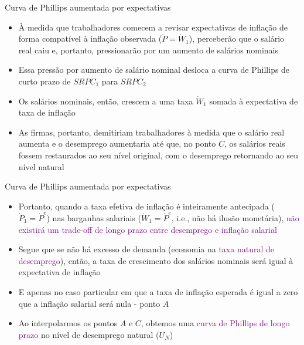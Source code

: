 \documentclass[10pt]{beamer}
\begin{document}
\begin{frame}{Curva de Phillips aumentada por expectativas}
    \begin{itemize}
        \item À medida que trabalhadores comecem a revisar expectativas de inflação de forma compatível à inflação observada ($\dot{P} = \dot{W}_1$), perceberão que o salário real caiu e, portanto, pressionarão por um aumento de salários nominais
        \bigskip
        \item Essa pressão por aumento de salário nominal desloca a curva de Phillips de curto prazo de $SRPC_1$ para $SRPC_2$
        \bigskip
        \item Os salários nominais, então, crescem a uma taxa $\dot{W}_1$ somada à expectativa de taxa de inflação
        \bigskip
        \item As firmas, portanto, demitiriam trabalhadores à medida que o salário real aumenta e o desemprego aumentaria até que, no ponto $C$, os salários reais fossem restaurados ao seu nível original, com o desemprego retornando ao seu nível natural
    \end{itemize}    
\end{frame}

\begin{frame}{Curva de Phillips aumentada por expectativas}
    \begin{itemize}
        \item Portanto, quando a taxa efetiva de inflação é inteiramente antecipada ($\dot{P}_1=\dot{P}^e$) nas barganhas salariais ($\dot{W}_1 = \dot{P}^e$, i.e., não há ilusão monetária), \textcolor{purple}{não existirá um trade-off de longo prazo entre desemprego e inflação salarial}
        \bigskip
        \item Segue que se não há excesso de demanda (economia na \textcolor{purple}{taxa natural de desemprego}), então, a taxa de crescimento dos salários nominais será igual à expectativa de inflação
        \bigskip
        \item E apenas no caso particular em que a taxa de inflação esperada é igual a zero que a inflação salarial será nula - ponto $A$
        \bigskip
        \item Ao interpolarmos os pontos $A$ e  $C$, obtemos uma \textcolor{purple}{curva de Phillips de longo prazo} no nível de desemprego natural ($U_N$)
    \end{itemize}    
\end{frame}
\end{document}
